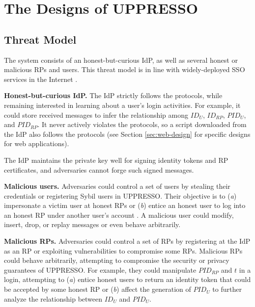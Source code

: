 \section{The Designs of UPPRESSO}
\label{sec:UPPRESSO}


\subsection{Threat Model}
\label{subsec:threatmodel}
The system consists of an honest-but-curious IdP, as well as several honest or malicious RPs and users. This threat model is in line with widely-deployed SSO services in the Internet \cite{OpenIDConnect,rfc6749, SAML, SAMLIdentifier}.


\noindent \textbf{Honest-but-curious IdP.} The IdP strictly follows the protocols,
 while remaining interested in learning about a user's login activities.
For example, it could store received messages to infer the relationship among $ID_U$, $ID_{RP}$, $PID_{U}$, and $PID_{RP}$.
It never actively violates the protocols,
 so a script downloaded from the IdP also follows the protocols (see Section \ref{sec:web-design} for specific designs for web applications).

The IdP maintains the private key well for signing identity tokens and RP certificates, %
and adversaries cannot forge such signed messages.


\noindent \textbf{Malicious users.} Adversaries could control a set of users by stealing their credentials or registering Sybil users in UPPRESSO.
 Their objective is to (\emph{a}) impersonate a victim user at honest RPs or (\emph{b}) entice an honest user to log into an honest RP under another user's account  \cite{SPRESSO, FettKS14}.
A malicious user could modify, insert, drop, or replay messages or even behave arbitrarily.

\noindent \textbf{Malicious RPs.}
Adversaries could control a set of RPs by registering at the IdP as an RP or exploiting vulnerabilities to compromise some RPs.
Malicious RPs could behave arbitrarily, attempting to compromise the security or privacy guarantees of UPPRESSO.
For example, they could manipulate $PID_{RP}$ and $t$ in a login, attempting to (\emph{a}) entice honest users to return an identity token that could be accepted by some honest RP or (\emph{b}) affect the generation of $PID_U$ to further analyze the relationship between $ID_U$ and $PID_U$.


